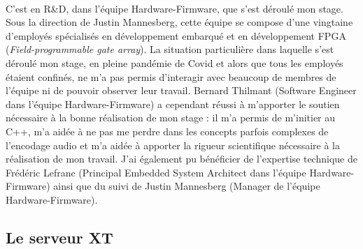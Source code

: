 \documentclass{article}
\begin{document}
    \paragraph{}
    C'est en R\&D, dans l'équipe Hardware-Firmware, que s'est déroulé mon stage. Sous la direction de Justin Mannesberg, cette équipe se compose d'une vingtaine d'employés spécialisés en développement embarqué et en développement FPGA (\emph{Field-programmable gate array}). La situation particulière dans laquelle s'est déroulé mon stage, en pleine pandémie de Covid et alors que tous les employés étaient confinés, ne m'a pas permis d'interagir avec beaucoup de membres de l'équipe ni de pouvoir observer leur travail. Bernard Thilmant (Software Engineer dans l'équipe Hardware-Firmware) a cependant réussi à m'apporter le soutien nécessaire à la bonne réalisation de mon stage : il m'a permis de m'initier au C++, m'a aidée à ne pas me perdre dans les concepts parfois complexes de l'encodage audio et m'a aidée à apporter la rigueur scientifique nécessaire à la réalisation de mon travail. J'ai également pu bénéficier de l'expertise technique de Frédéric Lefranc (Principal Embedded System Architect dans l'équipe Hardware-Firmware) ainsi que du suivi de Justin Mannesberg (Manager de l'équipe Hardware-Firmware).

    \subsection{Le serveur XT}
\end{document}
